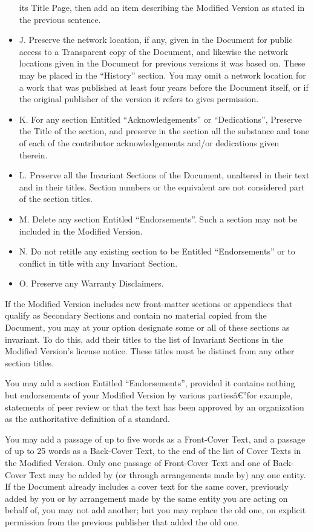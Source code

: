 \begin{itemize}
  its Title Page, then add an item describing the Modified Version as
  stated in the previous sentence.
\item
  J. Preserve the network location, if any, given in the Document for
  public access to a Transparent copy of the Document, and likewise the
  network locations given in the Document for previous versions it was
  based on. These may be placed in the ``History'' section. You may omit
  a network location for a work that was published at least four years
  before the Document itself, or if the original publisher of the
  version it refers to gives permission.
\item
  K. For any section Entitled ``Acknowledgements'' or ``Dedications'',
  Preserve the Title of the section, and preserve in the section all the
  substance and tone of each of the contributor acknowledgements and/or
  dedications given therein.
\item
  L. Preserve all the Invariant Sections of the Document, unaltered in
  their text and in their titles. Section numbers or the equivalent are
  not considered part of the section titles.
\item
  M. Delete any section Entitled ``Endorsements''. Such a section may
  not be included in the Modified Version.
\item
  N. Do not retitle any existing section to be Entitled ``Endorsements''
  or to conflict in title with any Invariant Section.
\item
  O. Preserve any Warranty Disclaimers.
\end{itemize}

If the Modified Version includes new front-matter sections or appendices
that qualify as Secondary Sections and contain no material copied from
the Document, you may at your option designate some or all of these
sections as invariant. To do this, add their titles to the list of
Invariant Sections in the Modified Version's license notice. These
titles must be distinct from any other section titles.

You may add a section Entitled ``Endorsements'', provided it contains
nothing but endorsements of your Modified Version by various
partiesâ€''for example, statements of peer review or that the text has
been approved by an organization as the authoritative definition of a
standard.

You may add a passage of up to five words as a Front-Cover Text, and a
passage of up to 25 words as a Back-Cover Text, to the end of the list
of Cover Texts in the Modified Version. Only one passage of Front-Cover
Text and one of Back-Cover Text may be added by (or through arrangements
made by) any one entity. If the Document already includes a cover text
for the same cover, previously added by you or by arrangement made by
the same entity you are acting on behalf of, you may not add another;
but you may replace the old one, on explicit permission from the
previous publisher that added the old one.

